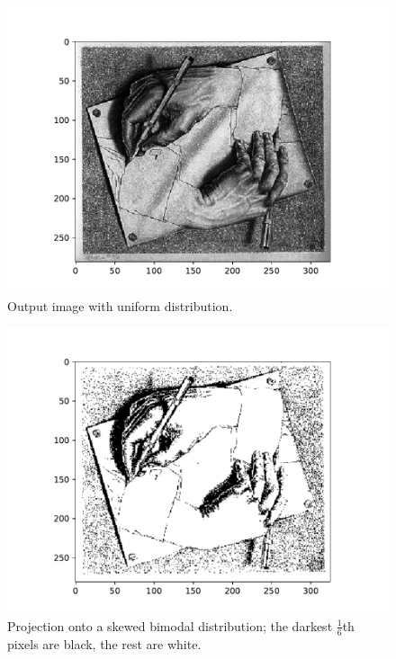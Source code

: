 \documentclass[psamsfonts]{amsart}
\theoremstyle{definition}
\theoremstyle{remark}
\numberwithin{equation}{section}
\begin{document}
\begin{figure}
\centering
\includegraphics[width=\textwidth]{../images/rescaled.pdf}
\caption{Output image with uniform distribution.}
\label{fig4}
\end{figure}

\begin{figure}
\centering
\includegraphics[width=\textwidth]{../images/bimodal.pdf}
\caption{Projection onto a skewed bimodal distribution; 
the darkest $\frac{1}{6}$th pixels are black, the rest are white.}
\label{fig4}
\end{figure}
\end{document}
